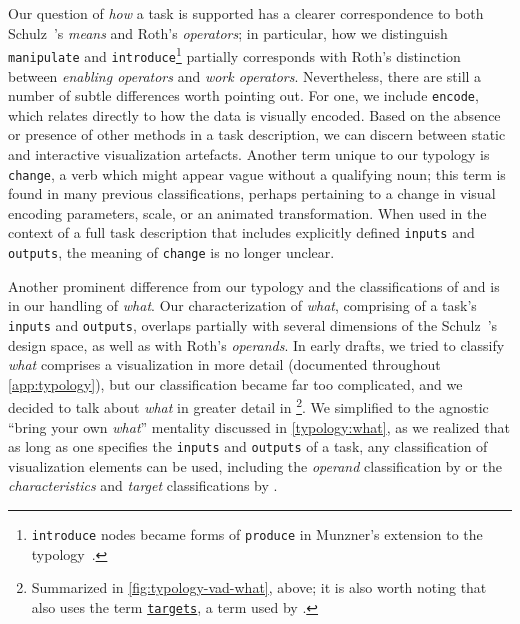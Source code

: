 Our question of {\it how} a task is supported has a clearer correspondence to both Schulz~\etal's {\it means} and Roth's {\it operators}; in particular, how we distinguish {\tt manipulate} and {\tt introduce}\footnote{{\tt introduce} nodes became forms of {\tt produce} in Munzner's extension to the typology~\cite{Munzner2014}.} partially corresponds with Roth's distinction between {\it enabling operators} and {\it work operators}.
Nevertheless, there are still a number of subtle differences worth pointing out.
For one, we include {\tt encode}, which relates directly to how the data is visually encoded. 
Based on the absence or presence of other methods in a task description, we can discern between static and interactive visualization artefacts.
Another term unique to our typology is {\tt change}, a verb which might appear vague without a qualifying noun; this term is found in many previous classifications, perhaps pertaining to a change in visual encoding parameters, scale, or an animated transformation. 
When used in the context of a full task description that includes explicitly defined {\tt inputs} and {\tt outputs}, the meaning of {\tt change} is no longer unclear.

Another prominent difference from our typology and the classifications of \citet{Roth2013} and \citet{Schulz2013} is in our handling of {\it what}.
Our characterization of {\it what}, comprising of a task's {\tt inputs} and {\tt outputs}, overlaps partially with several dimensions of the Schulz~\etal's design space, as well as with Roth's {\it operands}.
In early drafts, we tried to classify {\it what} comprises a visualization in more detail (documented throughout \autoref{app:typology}), but our classification became far too complicated, and we decided to talk about {\it what} in greater detail in \citet{Munzner2014}\footnote{Summarized in \autoref{fig:typology-vad-what}, above; it is also worth noting that \citet{Munzner2014} also uses the term \underline{{\tt targets}}, a term used by \citet{Schulz2013}.}.
We simplified to the agnostic ``bring your own {\it what}'' mentality discussed in \autoref{typology:what}, as we realized that as long as one specifies the {\tt inputs} and {\tt outputs} of a task, any classification of visualization elements can be used, including the {\it operand} classification by \citet{Roth2013} or the {\it characteristics} and {\it target} classifications by \citet{Schulz2013}.

